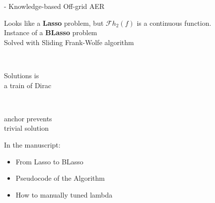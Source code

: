 \begin{frame}{\blaster - Knowledge-based Off-grid AER}
        \begin{center}
            Looks like a \textbf{Lasso} problem, but $\mathcal{F}h_2 (f)$ is a continuous function.
            \\Instance of a \textbf{BLasso} problem\cite{bredies2020sparsity}
            \\Solved with Sliding Frank-Wolfe algorithm \cite{denoyelle2019sliding}
        \end{center}

        \begin{center}
            \textcolor{mygreen}{ \qquad
            \cmark \, \parbox{8.5em}{Solutions is \\ a train of Dirac} \qquad
            \cmark \, \parbox{8em}{anchor prevents \\ trivial solution}}
        \end{center}

        In the manuscript:
        \begin{itemize}
            \item From Lasso to BLasso
            \item Pseudocode of the Algorithm
            \item How to manually tuned lambda
        \end{itemize}
\end{frame}

